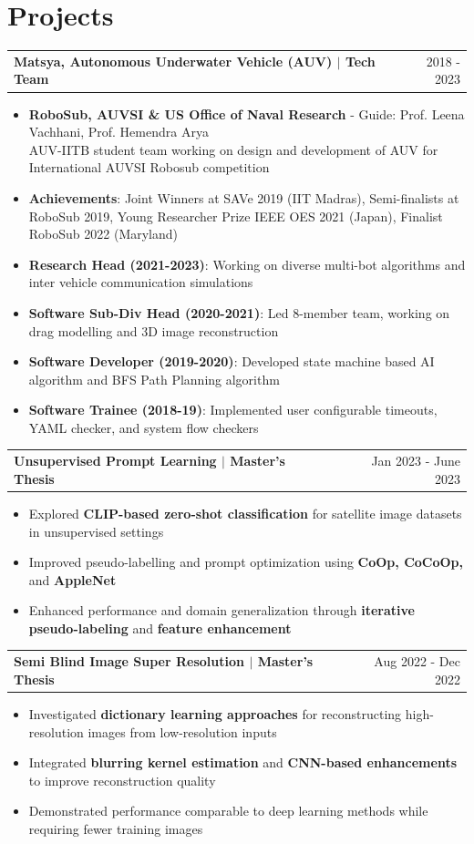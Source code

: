 \documentclass[a4paper,10pt]{article}
\makeatletter
\newenvironment{joblong}[2]
    {
    \begin{tabularx}{\linewidth}{@{}l X r@{}}
    \textbf{#1} & \hfill &  #2 \\[3.75pt]
    \end{tabularx}
    \begin{minipage}[t]{\linewidth}
    \begin{itemize}[nosep,after=\strut, leftmargin=1em, itemsep=3pt,label=--]
    }
    {
    \end{itemize}
    \end{minipage}
    }
\makeatother
\begin{document}
\section{Projects}

\begin{joblong}{{\color{adobeblue}Matsya, Autonomous Underwater Vehicle (AUV)} $|$ Tech Team}{2018 - 2023}
\item \textbf{RoboSub, AUVSI \& US Office of Naval Research} - Guide: Prof. Leena Vachhani, Prof. Hemendra Arya \\
AUV-IITB student team working on design and development of AUV for International AUVSI Robosub competition
\item \textbf{Achievements}: Joint Winners at SAVe 2019 (IIT Madras), Semi-finalists at RoboSub 2019, Young Researcher Prize IEEE OES 2021 (Japan), Finalist RoboSub 2022 (Maryland)
\item \textbf{Research Head (2021-2023)}: Working on diverse multi-bot algorithms and inter vehicle communication simulations
\item \textbf{Software Sub-Div Head (2020-2021)}: Led 8-member team, working on drag modelling and 3D image reconstruction
\item \textbf{Software Developer (2019-2020)}: Developed state machine based AI algorithm and BFS Path Planning algorithm
\item \textbf{Software Trainee (2018-19)}: Implemented user configurable timeouts, YAML checker, and system flow checkers
\end{joblong}

\begin{joblong}{{\color{adobeblue}Unsupervised Prompt Learning} $|$ Master's Thesis}{Jan 2023 - June 2023}
\item Explored \textbf{CLIP-based zero-shot classification} for satellite image datasets in unsupervised settings
\item Improved pseudo-labelling and prompt optimization using \textbf{CoOp, CoCoOp,} and \textbf{AppleNet}
\item Enhanced performance and domain generalization through \textbf{ iterative pseudo-labeling} and \textbf{ feature enhancement}
\end{joblong}

\begin{joblong}{{\color{adobeblue}Semi Blind Image Super Resolution} $|$ Master's Thesis}{Aug 2022 - Dec 2022}
\item Investigated \textbf{dictionary learning approaches} for reconstructing high-resolution images from low-resolution inputs
\item Integrated \textbf{blurring kernel estimation} and \textbf{CNN-based enhancements} to improve reconstruction quality
\item Demonstrated performance comparable to deep learning methods while requiring fewer training images
\end{joblong}
\end{document}
